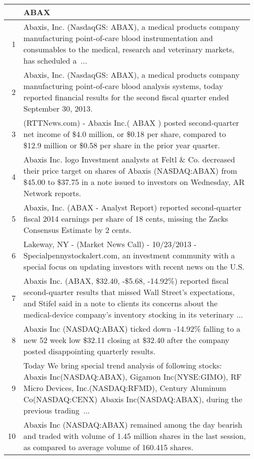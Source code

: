 \documentclass{tufte-handout}\usepackage[]{graphicx}\usepackage[]{color}
\begin{document}
\begin{tabularx}{\textwidth}{rX}
  \hline
 & ABAX \\ 
  \hline
1 &  Abaxis, Inc. (NasdaqGS: ABAX), a medical products company manufacturing point-of-care blood instrumentation and consumables to the medical, research and veterinary markets, has scheduled a ...  \\ 
  2 &  Abaxis, Inc. (NasdaqGS: ABAX), a medical products company manufacturing point-of-care blood analysis systems, today reported financial results for the second fiscal quarter ended September 30, 2013.  \\ 
  3 &  (RTTNews.com) - Abaxis Inc.( ABAX ) posted second-quarter net income of \$4.0 million, or \$0.18 per share, compared to \$12.9 million or \$0.58 per share in the prior year quarter.  \\ 
  4 &  Abaxis Inc. logo Investment analysts at Feltl \& Co. decreased their price target on shares of Abaxis (NASDAQ:ABAX) from \$45.00 to \$37.75 in a note issued to investors on Wednesday, AR Network reports.  \\ 
  5 &  Abaxis, Inc. (ABAX - Analyst Report) reported second-quarter fiscal 2014 earnings per share of 18 cents, missing the Zacks Consensus Estimate by 2 cents.  \\ 
  6 &  Lakeway, NY - (Market News Call) - 10/23/2013 - Specialpennystockalert.com, an investment community with a special focus on updating investors with recent news on the U.S.  \\ 
  7 &  Abaxis Inc. (ABAX, \$32.40, -\$5.68, -14.92\%) reported fiscal second-quarter results that missed Wall Street's expectations, and Stifel said in a note to clients its concerns about the medical-device company's inventory stocking in its veterinary ...  \\ 
  8 &  Abaxis Inc (NASDAQ:ABAX) ticked down -14.92\% falling to a new 52 week low \$32.11 closing at \$32.40 after the company posted disappointing quarterly results.  \\ 
  9 &  Today We bring special trend analysis of following stocks: Abaxis Inc(NASDAQ:ABAX), Gigamon Inc(NYSE:GIMO), RF Micro Devices, Inc.(NASDAQ:RFMD), Century Aluminum Co(NASDAQ:CENX) Abaxis Inc(NASDAQ:ABAX), during the previous trading ...  \\ 
  10 &  Abaxis Inc (NASDAQ:ABAX) remained among the day bearish and traded with volume of 1.45 million shares in the last session, as compared to average volume of 160.415 shares.  \\ 
   \hline
\end{tabularx}
\end{document}
